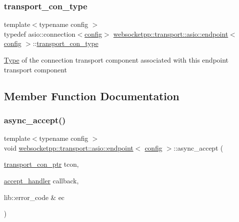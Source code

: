 \subsubsection{\texorpdfstring{transport\+\_\+con\+\_\+type}{transport\_con\_type}}
{\footnotesize\ttfamily template$<$typename config $>$ \\
typedef asio\+::connection$<$\mbox{\hyperlink{classconfig}{config}}$>$ \mbox{\hyperlink{classwebsocketpp_1_1transport_1_1asio_1_1endpoint}{websocketpp\+::transport\+::asio\+::endpoint}}$<$ \mbox{\hyperlink{classconfig}{config}} $>$\+::\mbox{\hyperlink{classwebsocketpp_1_1transport_1_1asio_1_1endpoint_a75f3102766fd3ba8230e99a2b0e00457}{transport\+\_\+con\+\_\+type}}}

\mbox{\hyperlink{struct_type}{Type}} of the connection transport component associated with this endpoint transport component 

\subsection{Member Function Documentation}
\mbox{\label{classwebsocketpp_1_1transport_1_1asio_1_1endpoint_ae24b2ea11e8ce90b6101c1ab56d7fe48}} 
\subsubsection{\texorpdfstring{async\+\_\+accept()}{async\_accept()}\hspace{0.1cm}{\footnotesize\ttfamily [1/2]}}
{\footnotesize\ttfamily template$<$typename config $>$ \\
void \mbox{\hyperlink{classwebsocketpp_1_1transport_1_1asio_1_1endpoint}{websocketpp\+::transport\+::asio\+::endpoint}}$<$ \mbox{\hyperlink{classconfig}{config}} $>$\+::async\+\_\+accept (\begin{DoxyParamCaption}\item[{\mbox{\hyperlink{classwebsocketpp_1_1transport_1_1asio_1_1endpoint_ac5fc306f32d15f92dd1b22366eaba62d}{transport\+\_\+con\+\_\+ptr}}}]{tcon,  }\item[{\mbox{\hyperlink{namespacewebsocketpp_1_1transport_a9326ea831379368ee47841b2e46cb009}{accept\+\_\+handler}}}]{callback,  }\item[{lib\+::error\+\_\+code \&}]{ec }\end{DoxyParamCaption})\hspace{0.3cm}{\ttfamily [inline]}}



